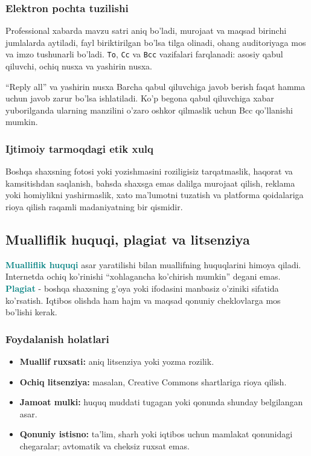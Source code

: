 \documentclass[11pt,a4paper,oneside]{book}
\newcommand{\term}[1]{\textbf{\textcolor{Teal}{#1}}\index{#1}}
\newcommand{\code}[1]{\texttt{#1}}
\begin{document}
\subsubsection{Elektron pochta tuzilishi}
Professional xabarda mavzu satri aniq bo'ladi, murojaat va maqsad birinchi jumlalarda aytiladi, fayl biriktirilgan bo'lsa tilga olinadi, ohang auditoriyaga mos va imzo tushunarli bo'ladi. \code{To}, \code{Cc} va \code{Bcc} vazifalari farqlanadi: asosiy qabul qiluvchi, ochiq nusxa va yashirin nusxa.

\begin{warningbox}{“Reply all” va yashirin nusxa}
Barcha qabul qiluvchiga javob berish faqat hamma uchun javob zarur bo'lsa ishlatiladi. Ko'p begona qabul qiluvchiga xabar yuborilganda ularning manzilini o'zaro oshkor qilmaslik uchun Bcc qo'llanishi mumkin.
\end{warningbox}

\subsubsection{Ijtimoiy tarmoqdagi etik xulq}
Boshqa shaxsning fotosi yoki yozishmasini roziligisiz tarqatmaslik, haqorat va kamsitishdan saqlanish, bahsda shaxsga emas dalilga murojaat qilish, reklama yoki homiylikni yashirmaslik, xato ma'lumotni tuzatish va platforma qoidalariga rioya qilish raqamli madaniyatning bir qismidir.
\subsection{Mualliflik huquqi, plagiat va litsenziya}
\term{Mualliflik huquqi} asar yaratilishi bilan muallifning huquqlarini himoya qiladi. Internetda ochiq ko'rinishi “xohlagancha ko'chirish mumkin” degani emas. \term{Plagiat} - boshqa shaxsning g'oya yoki ifodasini manbasiz o'ziniki sifatida ko'rsatish. Iqtibos olishda ham hajm va maqsad qonuniy cheklovlarga mos bo'lishi kerak.

\subsubsection{Foydalanish holatlari}
\begin{itemize}
\item \textbf{Muallif ruxsati:} aniq litsenziya yoki yozma rozilik.
\item \textbf{Ochiq litsenziya:} masalan, Creative Commons shartlariga rioya qilish.
\item \textbf{Jamoat mulki:} huquq muddati tugagan yoki qonunda shunday belgilangan asar.
\item \textbf{Qonuniy istisno:} ta'lim, sharh yoki iqtibos uchun mamlakat qonunidagi chegaralar; avtomatik va cheksiz ruxsat emas.
\end{itemize}
\end{document}
